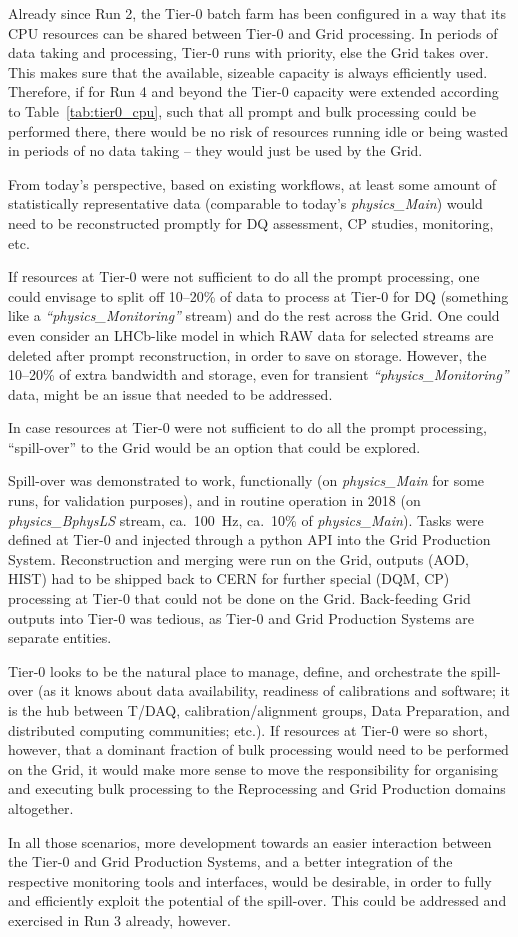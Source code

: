 Already since Run 2, the Tier-0 batch farm has been configured in a way that its CPU resources can be shared between Tier-0 and Grid processing. In periods of data taking and processing, Tier-0 runs with priority, else the Grid takes over. This makes sure that the available, sizeable capacity is always efficiently used. Therefore, if for Run 4 and beyond the Tier-0 capacity were extended according to Table~\ref{tab:tier0_cpu}, such that all prompt and bulk processing could be performed there, there would be no risk of resources running idle or being wasted in periods of no data taking -- they would just be used by the Grid. 
 
From today's perspective, based on existing workflows, at least some amount of statistically representative data (comparable to today's {\it physics\_Main}) would need to be reconstructed promptly for DQ assessment, CP studies, monitoring, etc. 

If resources at Tier-0 were not sufficient to do all the prompt processing, one could envisage to split off 10--20\% of data to process at Tier-0 for DQ (something like a {\it ``physics\_Monitoring''} stream) and do the rest across the Grid. One could even consider an LHCb-like model in which RAW data for selected streams are deleted after prompt reconstruction, in order to save on storage. However, the 10--20\% of extra bandwidth and storage, even for transient {\it ``physics\_Monitoring''} data, might be an issue that needed to be addressed.

In case resources at Tier-0 were not sufficient to do all the prompt processing, ``spill-over'' to the Grid would be an option that could be explored.

Spill-over was demonstrated to work, functionally (on {\it physics\_Main} for some runs, for validation purposes), and in routine operation in 2018 (on {\it physics\_BphysLS} stream, ca.\ 100~Hz, ca.\ 10\% of {\it physics\_Main}). Tasks were defined at Tier-0 and injected through a python API into the Grid Production System. Reconstruction and merging were run on the Grid, outputs (AOD, HIST) had to be shipped back to CERN for further special (DQM, CP) processing at Tier-0 that could not be done on the Grid. Back-feeding Grid outputs into Tier-0 was tedious, as Tier-0 and Grid Production Systems are separate entities. 

Tier-0 looks to be the natural place to manage, define, and orchestrate the spill-over (as it knows about data availability, readiness of calibrations and software; it is the hub between T/DAQ, calibration/alignment groups, Data Preparation, and distributed computing communities; etc.). If resources at Tier-0 were so short, however, that a dominant fraction of bulk processing would need to be performed on the Grid, it would make more sense to move the responsibility for organising and executing bulk processing to the Reprocessing and Grid Production domains altogether. 

In all those scenarios, more development towards an easier interaction between the Tier-0 and Grid Production Systems, and a better integration of the respective monitoring tools and interfaces, would be desirable, in order to fully and efficiently exploit the potential of the spill-over. This could be addressed and exercised in Run 3 already, however. 
